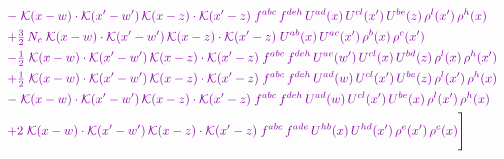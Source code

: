 \documentclass[10pt]{article}
\numberwithin{equation}{section}
\begin{document}
\begin{align}
&\quad{\color{CC}-\;\mathcal{K}(x-w)\cdot\mathcal{K}(x'-w')\,\mathcal{K}(x-z)\cdot\mathcal{K}(x'-z)\;f^{abc}\,f^{deh}\,U^{ad}(x)\,U^{cl}(x')\,U^{be}(z)\,\rho^{l}(x')\,\rho^{h}(x)}\notag\\
&\quad{\color{CC}+\tfrac{3}{2}\,N_c\;\mathcal{K}(x-w)\cdot\mathcal{K}(x'-w')\,\mathcal{K}(x-z)\cdot\mathcal{K}(x'-z)\;U^{ab}(x)\,U^{ac}(x')\,\rho^{b}(x)\,\rho^{c}(x')}\notag\\
&\quad{\color{CC}-\tfrac{1}{2}\;\mathcal{K}(x-w)\cdot\mathcal{K}(x'-w')\,\mathcal{K}(x-z)\cdot\mathcal{K}(x'-z)\;f^{abc}\,f^{deh}\,U^{ae}(w')\,U^{cl}(x)\,U^{bd}(z)\,\rho^{l}(x)\,\rho^{h}(x')}\notag\\
&\quad{\color{CC}+\tfrac{1}{2}\;\mathcal{K}(x-w)\cdot\mathcal{K}(x'-w')\,\mathcal{K}(x-z)\cdot\mathcal{K}(x'-z)\;f^{abc}\,f^{deh}\,U^{ad}(w)\,U^{cl}(x')\,U^{be}(z)\,\rho^{l}(x')\,\rho^{h}(x)}\notag\\
&\quad{\color{CC}-\;\mathcal{K}(x-w)\cdot\mathcal{K}(x'-w')\,\mathcal{K}(x-z)\cdot\mathcal{K}(x'-z)\;f^{abc}\,f^{deh}\,U^{ad}(w)\,U^{cl}(x')\,U^{be}(x)\,\rho^{l}(x')\,\rho^{h}(x)}\notag\\
&\quad{\color{CC}+2\;\mathcal{K}(x-w)\cdot\mathcal{K}(x'-w')\,\mathcal{K}(x-z)\cdot\mathcal{K}(x'-z)\;f^{abc}\,f^{ade}\,U^{hb}(x)\,U^{hd}(x')\,\rho^{e}(x')\,\rho^{c}(x)}\Bigg]\label{eq:P13}
\end{align}
\end{document}
